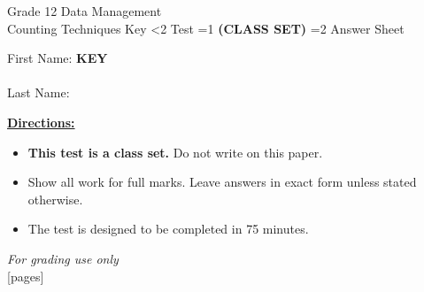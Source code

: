\documentclass[addpoints]{exam}
\newcommand{\event}{Counting Techniques}
\newcommand{\tournament}{}
\def\type{0}
\begin{document}
\begin{center}
    {\huge Grade 12 Data Management \\ \event
    \ifprintanswers \space Key
    \else \space \ifnum\type<2 Test \fi \ifnum\type=1 \textbf{(CLASS SET)} \fi
          \ifnum\type=2 Answer Sheet \fi
    \fi \\ \vspace{3mm}\tournament\vspace{1mm}}
\end{center}

\vspace{.25\textheight}

\begin{center}
    First Name: \ifprintanswers
    \underline{\hspace{3.5cm}}\textbf{KEY}\underline{\hspace{5.5cm}}\\\vspace{5mm}
    \else \underline{\hspace{10cm}}\\ \vspace{5mm} \fi
    Last Name: \underline{\hspace{10cm}}\\ \vspace{5mm}
\end{center}

\noindent\textbf{\underline{Directions:}}
\begin{itemize}
    \ifnum\type=1 \item \textbf{This test is a class set.} Do not write on this paper. \fi
    \item Show all work for full marks. Leave answers in exact form unless stated otherwise.
    \item The test is designed to be completed in 75 minutes.
\end{itemize}
\begin{center}
\textit{For grading use only}\\
[pages]
\end{center}
\end{document}
